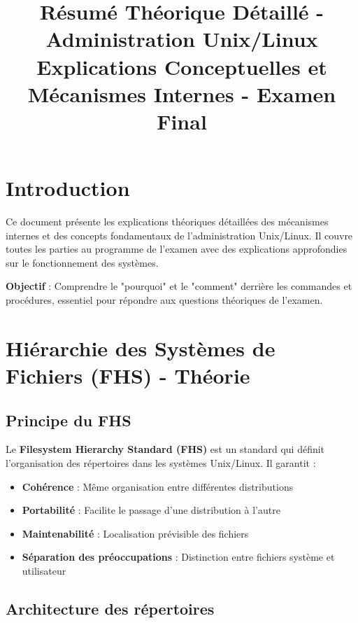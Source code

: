 \documentclass[12pt,a4paper]{article}
\title{\textbf{Résumé Théorique Détaillé - Administration Unix/Linux}\\
\large Explications Conceptuelles et Mécanismes Internes - Examen Final}
\author{}
\date{}
\begin{document}
\maketitle
\thispagestyle{fancy}

\section*{Introduction}
Ce document présente les explications théoriques détaillées des mécanismes internes et des concepts fondamentaux de l'administration Unix/Linux. Il couvre toutes les parties au programme de l'examen avec des explications approfondies sur le fonctionnement des systèmes.

\textbf{Objectif} : Comprendre le "pourquoi" et le "comment" derrière les commandes et procédures, essentiel pour répondre aux questions théoriques de l'examen.

\newpage
\tableofcontents
\newpage


\section{Hiérarchie des Systèmes de Fichiers (FHS) - Théorie}

\subsection{Principe du FHS}

Le \textbf{Filesystem Hierarchy Standard (FHS)} est un standard qui définit l'organisation des répertoires dans les systèmes Unix/Linux. Il garantit :

\begin{itemize}
    \item \textbf{Cohérence} : Même organisation entre différentes distributions
    \item \textbf{Portabilité} : Facilite le passage d'une distribution à l'autre
    \item \textbf{Maintenabilité} : Localisation prévisible des fichiers
    \item \textbf{Séparation des préoccupations} : Distinction entre fichiers système et utilisateur
\end{itemize}

\subsection{Architecture des répertoires}
\end{document}
